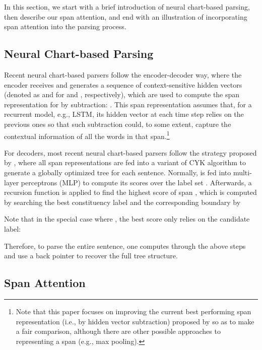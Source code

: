 \documentclass[11pt,a4paper]{article}
\begin{document}
In this section,
we start with a brief introduction of neural chart-based parsing, then describe our span attention, and 
end with an illustration of incorporating span attention into the parsing process.


\subsection{Neural Chart-based Parsing}
\label{sec: neural chart parser}

Recent neural chart-based parsers \cite{stern-etal-2017-minimal,kitaev-klein-2018-constituency,kitaev-etal-2019-multilingual,zhou-zhao-2019-head} follow the encoder-decoder way, where the encoder receives  and generates a sequence of context-sensitive hidden vectors (denoted as  and  for  and , respectively), which are used to compute the span representation  for 
by subtraction: .
This span representation assumes that, for a recurrent model, e.g., LSTM, its hidden vector at each time step relies on the previous ones so that such subtraction could, to some extent, capture the contextual information of all the words in that span.\footnote{Note that this paper focuses on improving the current best performing span representation (i.e., by hidden vector subtraction) proposed by \citet{stern-etal-2017-minimal} so as to make a fair comparison, although there are other possible approaches to representing a span (e.g., max pooling).}



For decoders, most recent neural chart-based parsers follow the strategy proposed by , where all span representations  are fed into a variant of CYK algorithm to generate a globally optimized tree for each sentence.
Normally,  is fed into multi-layer perceptrons (MLP) to compute its scores  over the label set .
Afterwards, a recursion function is applied to find the highest score  of span , which is computed by searching the best constituency label and the corresponding boundary   by

Note that in the special case where , the best score only relies on the candidate label:

Therefore, to parse the entire sentence, one computes  through the above steps and use a back pointer to recover the full tree structure.


\subsection{Span Attention}
\end{document}
